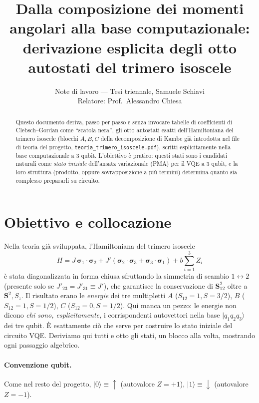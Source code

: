 \documentclass[11pt,a4paper]{article}
\title{\bfseries Dalla composizione dei momenti angolari alla base computazionale:\\
derivazione esplicita degli otto autostati del trimero isoscele}
\author{Note di lavoro — Tesi triennale, Samuele Schiavi\\ \small Relatore: Prof.\ Alessandro Chiesa}
\date{}
\newcommand{\ket}[1]{\lvert #1\rangle}
\newcommand{\uu}{\!\uparrow\!}
\newcommand{\dd}{\!\downarrow\!}
\begin{document}
\maketitle
\thispagestyle{fancy}

\begin{abstract}
\noindent
\begin{sloppypar}
Questo documento deriva, passo per passo e senza invocare tabelle di
coefficienti di Clebsch--Gordan come ``scatola nera'', gli otto autostati
esatti dell'Hamiltoniana del trimero isoscele (blocchi $A,B,C$ della
decomposizione di Kambe già introdotta nel file di teoria del progetto,
\texttt{teoria\_\allowbreak trimero\_\allowbreak isoscele.pdf}),
scritti esplicitamente nella base computazionale a 3 qubit. L'obiettivo è
pratico: questi stati sono i candidati naturali come \emph{stato iniziale}
dell'ansatz variazionale (PMA) per il VQE a 3 qubit, e la loro struttura
(prodotto, oppure sovrapposizione a più termini) determina quanto sia
complesso prepararli su circuito.
\end{sloppypar}
\end{abstract}

\section{Obiettivo e collocazione}

Nella teoria già sviluppata, l'Hamiltoniana del trimero isoscele
\begin{equation}
H = J\,\boldsymbol\sigma_1\cdot\boldsymbol\sigma_2
     + J'(\boldsymbol\sigma_2\cdot\boldsymbol\sigma_3+\boldsymbol\sigma_3\cdot\boldsymbol\sigma_1)
     + b\sum_{i=1}^3 Z_i
\label{eq:H}
\end{equation}
è stata diagonalizzata in forma chiusa sfruttando la simmetria di scambio
$1\leftrightarrow 2$ (presente solo se $J'_{23}=J'_{31}\equiv J'$), che
garantisce la conservazione di $\mathbf S_{12}^2$ oltre a $\mathbf S^2, S_z$.
Il risultato erano le \emph{energie} dei tre multipletti $A$ ($S_{12}=1,S=3/2$),
$B$ ($S_{12}=1,S=1/2$), $C$ ($S_{12}=0,S=1/2$). Qui manca un pezzo: le energie
non dicono \emph{chi sono, esplicitamente,} i corrispondenti autovettori nella
base $\ket{q_1q_2q_3}$ dei tre qubit. È esattamente ciò che serve per costruire
lo stato iniziale del circuito VQE. Deriviamo qui tutti e otto gli stati,
un blocco alla volta, mostrando ogni passaggio algebrico.

\paragraph{Convenzione qubit.} Come nel resto del progetto, $\ket{0}\equiv\uu$
(autovalore $Z=+1$), $\ket{1}\equiv\dd$ (autovalore $Z=-1$).
\end{document}
